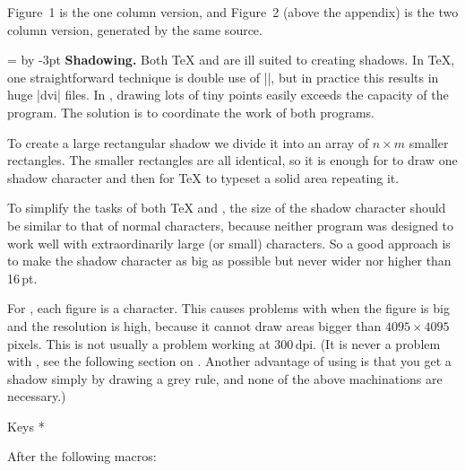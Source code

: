  
\endfigure

% 

Figure~1 is the one column version, and Figure~2 (above the appendix) is
the two column version, generated by the same source.





\def\beginshadowpar{\setbox0=\vbox\bgroup \kern3pt
 \advance\parindent by -3pt \leftskip=3pt\rightskip=3pt }
\def\endshadowpar{\par\kern3pt\egroup\framebox0\shadowbox0\box0 }

\bigskip %

\beginshadowpar\noindent
{\bf Shadowing.} Both {\TeX} and {\MF} are ill suited to creating
shadows. In {\TeX}, one straightforward technique is double use of
|\leaders|, but in practice this results in huge |dvi| files.  In {\MF},
drawing lots of tiny points easily exceeds the capacity of the program.
The solution is to coordinate the work of both programs.
\endshadowpar

To create a large rectangular shadow we divide it into an array of $n
\times m$ smaller rectangles. The smaller rectangles are all identical,
so it is enough for {\MF} to draw one shadow character and then for
{\TeX} to typeset a solid area repeating it.

To simplify the tasks of both {\TeX} and {\MF}, the size of the shadow
character should be similar to that of normal characters, because neither
program was designed to work well with extraordinarily large (or small)
characters. So a
good approach is to make the shadow character as big as possible but
never wider nor higher than 16$\,$pt.

For {\MTeX}, each figure is a character. This causes problems with {\MF}
when the figure is big and the resolution is high, because it cannot
draw areas bigger than $4095\times4095$ pixels. This is not usually a
problem working at 300$\,$dpi. (It is never a problem with {\MP}, see
the following section on {\PS}. Another advantage of using {\PS} is that
you get a shadow simply by drawing a grey rule, and none of the above
machinations are necessary.)


\subhead * Keys *

After the following {\MTeX} macros:

